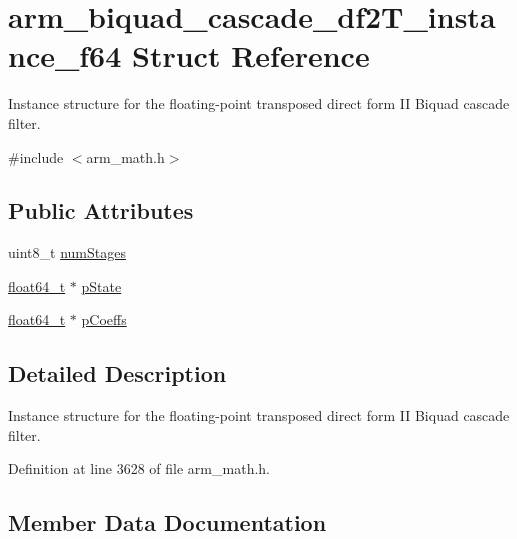 \hypertarget{structarm__biquad__cascade__df2_t__instance__f64}{}\section{arm\+\_\+biquad\+\_\+cascade\+\_\+df2\+T\+\_\+instance\+\_\+f64 Struct Reference}
\label{structarm__biquad__cascade__df2_t__instance__f64}


Instance structure for the floating-\/point transposed direct form II Biquad cascade filter.  




{\ttfamily \#include $<$arm\+\_\+math.\+h$>$}

\subsection*{Public Attributes}
\begin{DoxyCompactItemize}
\item 
uint8\+\_\+t \hyperlink{structarm__biquad__cascade__df2_t__instance__f64_ad55380ff835b533aa5168f836db8a4de}{num\+Stages}
\item 
\hyperlink{arm__math_8h_ac55f3ae81b5bc9053760baacf57e47f4}{float64\+\_\+t} $\ast$ \hyperlink{structarm__biquad__cascade__df2_t__instance__f64_a0bde57b618e3f9059b23b0de64e12ce3}{p\+State}
\item 
\hyperlink{arm__math_8h_ac55f3ae81b5bc9053760baacf57e47f4}{float64\+\_\+t} $\ast$ \hyperlink{structarm__biquad__cascade__df2_t__instance__f64_ae2f0180f9038c0393e1d6921bb3b878b}{p\+Coeffs}
\end{DoxyCompactItemize}


\subsection{Detailed Description}
Instance structure for the floating-\/point transposed direct form II Biquad cascade filter. 

Definition at line 3628 of file arm\+\_\+math.\+h.



\subsection{Member Data Documentation}
\mbox{\label{structarm__biquad__cascade__df2_t__instance__f64_ad55380ff835b533aa5168f836db8a4de}} 
